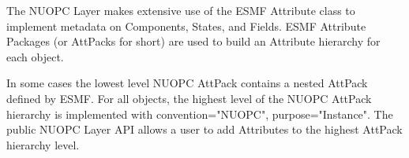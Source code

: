 \label{Metadata}

The NUOPC Layer makes extensive use of the ESMF Attribute class to implement metadata on Components, States, and Fields. ESMF Attribute Packages (or AttPacks for short) are used to build an Attribute hierarchy for each object.

In some cases the lowest level NUOPC AttPack contains a nested AttPack defined by ESMF. For all objects, the highest level of the NUOPC AttPack hierarchy is implemented with convention="NUOPC", purpose="Instance". The public NUOPC Layer API allows a user to add Attributes to the highest AttPack hierarchy level.

